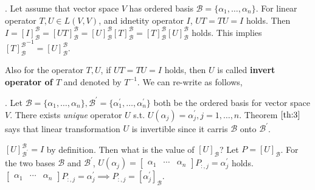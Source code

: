 \documentclass[8pt]{beamer}
\newcommand{\mc}[1]{\mathcal{#1}}
\newcommand{\tb}[1]{\textbf{#1}}
\newcommand{\ti}[1]{\textit{#1}}
\begin{document}
\begin{frame}{.}
    Let assume that vector space $V$ has ordered basis $\mc{B} =\{\alpha_1, \dots, \alpha_n\}$.
    For linear operator $T, U \in L(V,V)$, and idnetity operator $I$, $UT =TU = I$ holds.
    Then $I = [I]^{\mc{B}}_{\mc{B}} = [UT]^{\mc{B}}_{\mc{B}} = [U]^{\mc{B}}_{\mc{B}} [T]^{\mc{B}}_{\mc{B}} = [T]^{\mc{B}}_{\mc{B}} [U]^{\mc{B}}_{\mc{B}}$ holds.
    This implies ${[T]^{\mc{B}}_{\mc{B}}}^{-1} = [U]^{\mc{B}}_{\mc{B}}$.

    Also for the operator $T,U$, if $U T = T U = I$ holds, then $U$ is called \tb{invert operator of $T$} and denoted by $T^{-1}$.
    We can re-write as follows, 


\end{frame}

\begin{frame}{.}
    Let $\mc{B} = \{\alpha_1, \dots, \alpha_n\}, \mc{B}^\prime = \{\alpha_1^\prime, \dots, \alpha_n^\prime\}$ both be the ordered basis for vector space $V$.
    There exists \ti{unique} operator $U$ s.t. $U(\alpha_j) = \alpha_j^\prime, j=1, \dots, n$.
    Theorem $\ref{th:3}$ says that linear transformation $U$ is invertible since it carris $\mc{B}$ onto $\mc{B}^\prime$.

    \smallskip
    $[U]^{\mc{B}}_{\mc{B}^\prime} = I$ by definition.
    Then what is the value of $[U]_{\mc{B}}$?
    Let $P = [U]_{\mc{B}}$.
    For the two bases $\mc{B}$ and $\mc{B}^\prime$, $U(\alpha_j) = \left[ \begin{matrix}
        \alpha_1 & \cdots & \alpha_n
    \end{matrix}\right] P_{:, j} = \alpha^\prime_j$ holds.
    $\left[ \begin{matrix}
        \alpha_1 & \cdots & \alpha_n
    \end{matrix}\right] P_{:, j} = \alpha^\prime_j
    \implies P_{:, j} = [\alpha_j^\prime]_{\mc{B}}$.


\end{frame}
\end{document}
